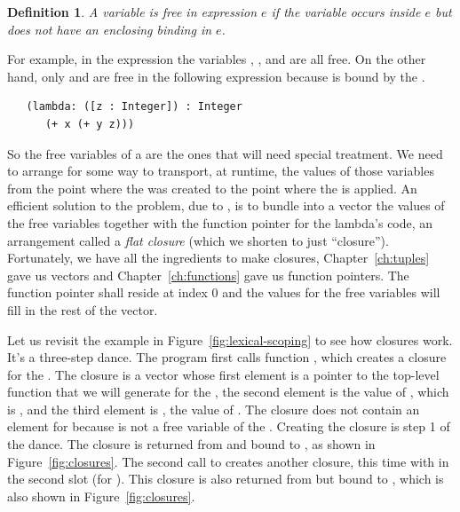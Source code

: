 \documentclass[11pt]{book}
\newtheorem{definition}[theorem]{Definition}
\begin{document}
\begin{definition}
A variable is \emph{free in expression} $e$ if the variable occurs
inside $e$ but does not have an enclosing binding in $e$.
\end{definition}

For example, in the expression  the variables
, , and  are all free.  On the other hand,
only  and  are free in the following expression
because  is bound by the .
\begin{lstlisting}
   (lambda: ([z : Integer]) : Integer
      (+ x (+ y z)))
\end{lstlisting}

So the free variables of a  are the ones that will need
special treatment. We need to arrange for some way to transport, at
runtime, the values of those variables from the point where the
 was created to the point where the  is
applied. An efficient solution to the problem, due to
\citet{Cardelli:1983aa}, is to bundle into a vector the values of the
free variables together with the function pointer for the lambda's
code, an arrangement called a \emph{flat closure} (which we shorten to
just ``closure'').   Fortunately,
we have all the ingredients to make closures, Chapter~\ref{ch:tuples}
gave us vectors and Chapter~\ref{ch:functions} gave us function
pointers. The function pointer shall reside at index $0$ and the
values for the free variables will fill in the rest of the vector.

Let us revisit the example in Figure~\ref{fig:lexical-scoping} to see
how closures work. It's a three-step dance. The program first calls
function , which creates a closure for the . The
closure is a vector whose first element is a pointer to the top-level
function that we will generate for the , the second
element is the value of , which is , and the third
element is , the value of . The closure does not
contain an element for  because  is not a free
variable of the . Creating the closure is step 1 of the
dance. The closure is returned from  and bound to , as
shown in Figure~\ref{fig:closures}.
%
The second call to  creates another closure, this time with
 in the second slot (for ). This closure is also
returned from  but bound to , which is also shown in
Figure~\ref{fig:closures}.
\end{document}
